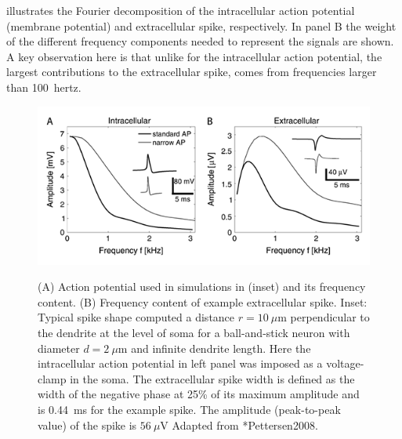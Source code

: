  illustrates the Fourier decomposition of the intracellular action potential (membrane potential) and extracellular spike, respectively. In panel B the weight of the different frequency components needed to represent the signals are shown. A key observation here is that unlike for the intracellular action potential, the largest contributions to the extracellular spike, comes from frequencies larger than 100~hertz.


\begin{figure}[!ht]
\begin{center}
\includegraphics{Figures/Spikes/Spikes-ball-and-stick-frequency-w90-r150}
\end{center}
\caption[]{(A) Action potential used in simulations in (inset) 
and its frequency content.
(B) Frequency content of example extracellular spike.
Inset: Typical spike shape computed a distance $r=10~\mu$m
perpendicular to the dendrite at the level of soma for a ball-and-stick 
neuron with diameter $d=2~\mu$m and infinite dendrite length.
Here the intracellular action potential in left panel was imposed as a voltage-clamp in the soma.
The extracellular spike width is defined as the width of the negative phase at 25\% of its maximum
amplitude and is 0.44~ms for the example spike. The amplitude (peak-to-peak value) of the spike is $56~\mu$V  
Adapted from \citeasnoun**{Pettersen2008}.}
 
\label{fig:Spikes:ball-and-stick-frequency}
\end{figure}

